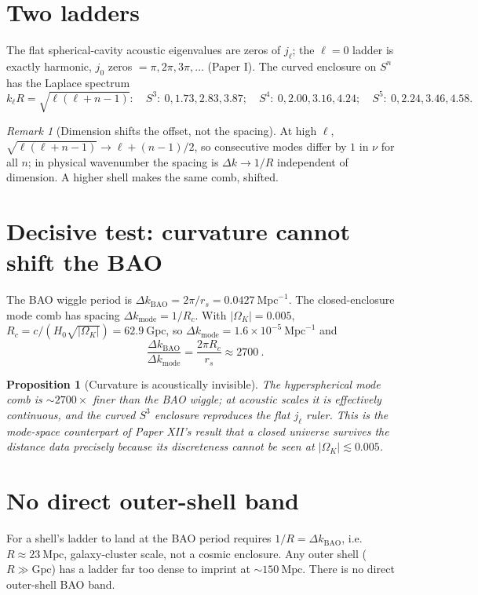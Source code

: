 \documentclass[11pt]{article}
\newtheorem{proposition}[theorem]{Proposition}
\theoremstyle{remark}
\newtheorem{remark}[theorem]{Remark}
\newcommand{\Mpc}{\mathrm{Mpc}}
\newcommand{\Gpc}{\mathrm{Gpc}}
\newcommand{\OmK}{\Omega_K}
\begin{document}
\section{Two ladders}
The flat spherical-cavity acoustic eigenvalues are zeros of $j_\ell$; the $\ell = 0$ ladder is exactly harmonic, $j_0$ zeros $= \pi, 2\pi, 3\pi, \dots$ (Paper I). The curved enclosure on $S^n$ has the Laplace spectrum
\begin{equation}
k_\ell R = \sqrt{\ell(\ell+n-1)}: \quad S^3:\ 0,1.73,2.83,3.87; \quad S^4:\ 0,2.00,3.16,4.24; \quad S^5:\ 0,2.24,3.46,4.58.
\end{equation}
\begin{remark}[Dimension shifts the offset, not the spacing]
At high $\ell$, $\sqrt{\ell(\ell+n-1)} \to \ell + (n-1)/2$, so consecutive modes differ by $1$ in $\nu$ for all $n$; in physical wavenumber the spacing is $\Delta k \to 1/R$ independent of dimension. A higher shell makes the same comb, shifted.
\end{remark}
\section{Decisive test: curvature cannot shift the BAO}
The BAO wiggle period is $\Delta k_{\mathrm{BAO}} = 2\pi/r_s = 0.0427\ \Mpc^{-1}$. The closed-enclosure mode comb has spacing $\Delta k_{\mathrm{mode}} = 1/R_c$. With $|\OmK| = 0.005$, $R_c = c/(H_0\sqrt{|\OmK|}) = 62.9\ \Gpc$, so $\Delta k_{\mathrm{mode}} = 1.6\times10^{-5}\ \Mpc^{-1}$ and
\begin{equation}
\boxed{\ \frac{\Delta k_{\mathrm{BAO}}}{\Delta k_{\mathrm{mode}}} = \frac{2\pi R_c}{r_s} \approx 2700\ }.
\label{eq:modesperwiggle}
\end{equation}
\begin{proposition}[Curvature is acoustically invisible]
The hyperspherical mode comb is $\sim 2700\times$ finer than the BAO wiggle; at acoustic scales it is effectively continuous, and the curved $S^3$ enclosure reproduces the flat $j_\ell$ ruler. This is the mode-space counterpart of Paper XII's result that a closed universe survives the distance data precisely because its discreteness cannot be seen at $|\OmK| \lesssim 0.005$.
\end{proposition}
\section{No direct outer-shell band}
For a shell's ladder to land at the BAO period requires $1/R = \Delta k_{\mathrm{BAO}}$, i.e. $R \approx 23\ \Mpc$, galaxy-cluster scale, not a cosmic enclosure. Any outer shell ($R \gg \Gpc$) has a ladder far too dense to imprint at $\sim 150\ \Mpc$. There is no direct outer-shell BAO band.
\end{document}
